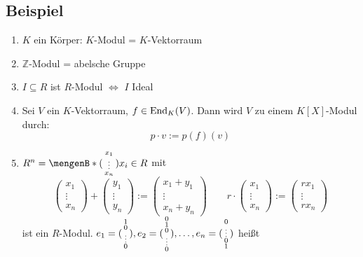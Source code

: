 \subsection[Beispiele verschiedener Module]{Beispiel} %
\label{sub:142}
\begin{enumerate}[(1)]
	\item $K$ ein Körper: $K$-Modul = $K$-Vektorraum
	\item $\mathds{Z}$-Modul = abelsche Gruppe
	\item $I \subseteq R$ ist $R$-Modul $\iff$ $I$ Ideal
	\item Sei $V$ ein $K$-Vektorraum, $f \in \operatorname{End}_K(V)$. Dann wird $V$ zu einem $K[X]$-Modul durch:
	\[
		p \cdot v := p(f)(v)
	\]
	\item $R^n = \set[ \enbrace{\begin{smallmatrix} x_1 \\ \vdots \\ x_n \end{smallmatrix}}]{x_i \in R} $ mit 
	\[
		\begin{pmatrix}
			x_1 \\ \vdots \\ x_n
		\end{pmatrix} + \begin{pmatrix}
			y_1 \\ \vdots \\ y_n
		\end{pmatrix} := \begin{pmatrix}
			x_1 + y_1 \\ \vdots \\ x_n + y_n
		\end{pmatrix} \qquad r \cdot \begin{pmatrix}
			x_1 \\ \vdots \\ x_n
		\end{pmatrix} := \begin{pmatrix}
			r x_1 \\ \vdots \\ r x_n
		\end{pmatrix}
	\]
	ist ein $R$-Modul. $e_1 = ( \begin{smallmatrix}
		1 \\ 0\\ \vdots \\ 0
	\end{smallmatrix}), e_2 = ( \begin{smallmatrix}
		0 \\ 1 \\ 0 \\ \vdots \\ 0
	\end{smallmatrix}), \ldots  , e_n = (\begin{smallmatrix}
		0 \\ \vdots \\ 0 \\ 1
	\end{smallmatrix})  $ heißt 
\end{enumerate}

